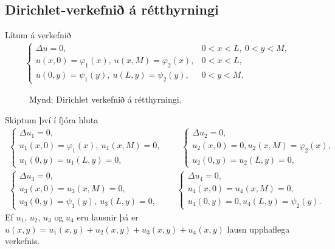 \documentclass[a4paper,10pt,icelandic]{sphinxmanual}
\begin{document}
\subsection{Dirichlet-verkefnið á rétthyrningi}
\label{\detokenize{Kafli03:dirichlet-verkefni-a-retthyrningi}}
Lítum á verkefnið
\begin{equation*}
\begin{split}\begin{cases} \Delta u=0, &0<x<L, \ 0<y<M,\\
 u(x,0)=\varphi_1(x), \ u(x,M)=\varphi_2(x), &0<x<L,\\
 u(0,y)=\psi_1(y), \ u(L,y)=\psi_2(y), &0<y<M.
 \end{cases}\end{split}
\end{equation*}
\begin{figure}[htbp]
\centering
\capstart

\noindent{}
\caption{Mynd: Dirichlet verkefnið á rétthyrningi.}\label{\detokenize{Kafli03:id11}}\end{figure}

Skiptum því í fjóra hluta
\begin{equation*}
\begin{split}\begin{cases} \Delta u_1=0,\\
 u_1(x,0)=\varphi_1(x), \ u_1(x,M)=0,\\
 u_1(0,y)=u_1(L,y)=0,
 \end{cases}\qquad
 \begin{cases} \Delta u_2=0,\\
 u_2(x,0)=0, u_2(x,M)=\varphi_2(x),\\
 u_2(0,y)=u_2(L,y)=0,
 \end{cases}\end{split}
\end{equation*}\begin{equation*}
\begin{split}\begin{cases} \Delta u_3=0,\\
 u_3(x,0)=u_3(x,M)=0,\\
 u_3(0,y)=\psi_1(y), \ u_3(L,y)=0,
 \end{cases} \qquad
 \begin{cases} \Delta u_4=0,\\
 u_4(x,0)=u_4(x,M)=0,\\
 u_4(0,y)=0, u_4(L,y)=\psi_2(y).
 \end{cases}\end{split}
\end{equation*}
Ef \(u_1\), \(u_2\), \(u_3\) og \(u_4\) eru lausnir þá er
\(u(x,y)=u_1(x,y)+u_2(x,y)+u_3(x,y)+u_4(x,y)\) lausn upphaflega verkefnis.
\end{document}
